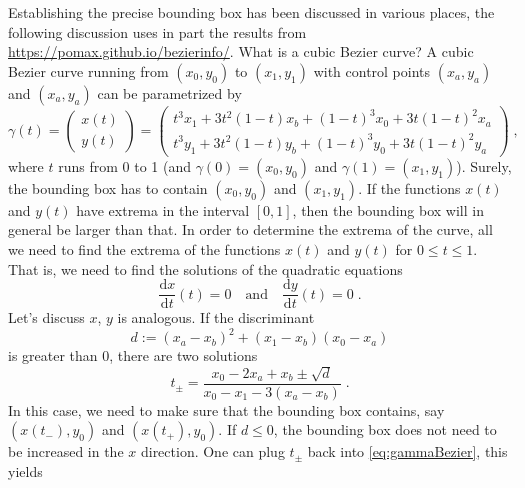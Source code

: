 Establishing the precise bounding box has been discussed in various places, the
following discussion uses in part the results from
\url{https://pomax.github.io/bezierinfo/}. What is a cubic Bezier curve? A
cubic Bezier curve running from $(x_0,y_0)$ to $(x_1,y_1)$ with control points
$(x_a,y_a)$ and $(x_a,y_a)$ can be parametrized by
\begin{equation}
 \gamma(t) =
 \begin{pmatrix} x(t)\\ y(t) \end{pmatrix} =
 \begin{pmatrix}t^3 x_{1}+3 t^2 (1-t) x_{b}+(1-t)^3
   x_{0}+3 t (1-t)^2 x_{a}\\
   t^3 y_{1}+3
   t^2 (1-t) y_{b}+(1-t)^3 y_{0}+3 t (1-t)^2
   y_{a}\end{pmatrix}\;,\label{eq:gammaBezier}
\end{equation}
where $t$ runs from 0 to 1 (and $\gamma(0)=(x_0,y_0)$ and
$\gamma(1)=(x_1,y_1)$). Surely, the bounding box has to contain
$(x_0,y_0)$ and $(x_1,y_1)$. If the functions $x(t)$ and $y(t)$ have extrema in
the interval $[0,1]$, then the bounding box will in general be larger than that.
In order to determine the extrema of the curve, all
we need to find the extrema of the functions $x(t)$ and $y(t)$ for $0\le t\le
1$. That is, we need to find the solutions of the quadratic equations
\begin{equation}
 \frac{\mathrm{d}x}{\mathrm{d}t}(t) = 0\quad\text{and}\quad
 \frac{\mathrm{d}y}{\mathrm{d}t}(t) = 0\;.
\end{equation}
Let's discuss $x$, $y$ is analogous. If the discriminant
\begin{equation}
 d := (x_a-x_b)^2+(x_1-x_b)(x_0-x_a)
\end{equation}
is greater than 0, there are two solutions
\begin{equation}
 t_\pm = \frac{x_{0}-2
   x_{a}+x_{b}\pm\sqrt{d}}{x_{0}-x_{1}-3(x_{a}- x_{b})} \;.
\end{equation}
In this case, we need to make sure that the bounding box contains, say
$(x(t_-),y_0)$ and $(x(t_+),y_0)$. If $d\le0$, the bounding box does not need to
be increased in the $x$ direction. One can plug $t_\pm$ back into
\eqref{eq:gammaBezier}, this yields
